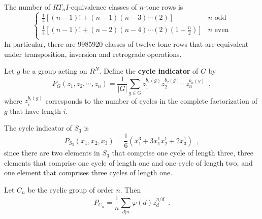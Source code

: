 \begin{corollary}
	\cite[54]{Reiner1985}
	\cite[127]{FripertingerLackner2015}	
	The number of $RT_nI$-equivalence classes of $n$-tone rows is
	\begin{equation}
		\begin{cases}
			\frac{1}{4} \left[ (n - 1)! + (n - 1) (n - 3) \cdots (2) \right]
			& n \text{ odd} \\
			\frac{1}{4} \left[ (n - 1)! + (n - 2) (n - 4) \cdots (2) (1 + \frac{n}{2})
			\right] & n \text{ even} \\
		\end{cases}
	\end{equation}
	In particular, there are 9985920 classes of twelve-tone rows that are equivalent under transposition, inversion and retrograde operations.
\end{corollary}

\begin{definition}
	\cite[87]{Aigner2007}
	Let $g$ be a group acting on $R^N$. Define the \textbf{cycle indicator} of $G$ by
	\begin{equation}
		P_G(z_1, z_2, \cdots, z_n) = \frac{1}{|G|} \sum_{g \in G} z_1^{b_1(g)} z_2^{b_2(g)}
		\cdots z_n^{b_n(g)} \enspace,
	\end{equation}
	where $z_i^{b_i(g)}$ corresponds to the number of cycles in the complete factorization
	of $g$ that have length $i$.
\end{definition}

\begin{example}
	The cycle indicator of $S_3$ is
	\begin{equation}
		P_{S_3}(x_1, x_2, x_3) = \frac{1}{6}(x_1^3 + 3 x_1^1 x_2^1 + 2 x_3^1) \enspace,
	\end{equation}
	since there are two elements in $S_3$ that comprise one cycle of length three,
	three elements that comprise one cycle of length one and one cycle of length two,
	and one element that comprises three cycles of length one.
\end{example}

\begin{example}
	Let $C_n$ be the cyclic group of order $n$. Then
	\begin{equation}
		P_{C_n} = \frac{1}{n} \sum_{d | n} \varphi(d) z_d^{n / d} \enspace.
	\end{equation}
\end{example}

